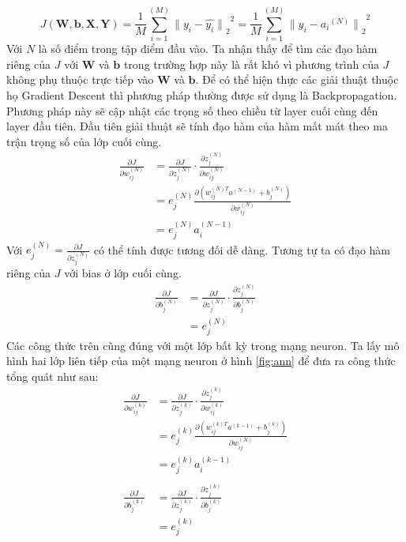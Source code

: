 \begin{equation}
	J
	\left(
		{\boldsymbol{W}},{\boldsymbol{b}},{\boldsymbol{X}},{\boldsymbol{Y}}
	\right)
	=
	{
		{\frac{1}{M}} 
		{\sum_{i=1}^{(M)}} 
		{ { {\parallel} y_i - \widehat{y_i} {\parallel} }_2 }^2
	}
	=
	{
		{\frac{1}{M}} 
		{\sum_{i=1}^{(M)}} 
		{ { {\parallel} y_i - {a_i}^{(N)} {\parallel} }_2 }^2
	}
\end{equation}
Với $N$ là số điểm trong tập điểm đầu vào. Ta nhận thấy để tìm các đạo hàm riêng của $J$ với ${\boldsymbol{W}}$ và ${\boldsymbol{b}}$ trong trường hợp này là rất khó vì phương trình của $J$ không phụ thuộc trực tiếp vào ${\boldsymbol{W}}$ và ${\boldsymbol{b}}$. Để có thể hiện thực các giải thuật thuộc họ Gradient Descent thì phương pháp thường được sử dụng là Backpropagation. Phương pháp này sẽ cập nhật các trọng số theo chiều từ layer cuối cùng đến layer đầu tiên. Đầu tiên giải thuật sẽ tính đạo hàm của hàm mất mát theo ma trận trọng số của lớp cuối cùng.
\begin{align*}
	\frac
		{ {\partial} J }
		{ {\partial} {w_{ij}^{(N)}} }
	&=
	\frac
		{ {\partial} J }
		{ {\partial} {z_{j}^{(N)}} }
	{\cdot}
	\frac
		{ {\partial} {z_{j}^{(N)}} }
		{ {\partial} {w_{ij}^{(N)}} } \\
	&=
	{e_{j}^{(N)}}
	{
		\frac
			{ {\partial} \left(
							{w_{ij}^{(N)T}}
							a^{(N-1)}
							+
							{b_{j}^{(N)}}
						 \right)
			}
			{ {\partial} {w_{ij}^{(N)}} }
	}\\
	&={e_{j}^{(N)}}{a_{i}^{(N-1)}}
\end{align*}
Với ${e_{j}^{(N)}}=\frac{{\partial}J}{{\partial}{z_{j}^{(N)}}}$ có thể tính được tương đối dễ dàng. Tương tự ta có đạo hàm riêng của $J$ với bias ở lớp cuối cùng.
\begin{align*}
	\frac
		{ {\partial} J }
		{ {\partial} {b_{j}^{(N)}} }
	&=
	\frac
		{ {\partial} J }
		{ {\partial} {z_{j}^{(N)}} }
	{\cdot}
	\frac
		{ {\partial} {z_{j}^{(N)}} }
		{ {\partial} {b_{j}^{(N)}} } \\
	&={e_{j}^{(N)}}
\end{align*}
Các công thức trên cũng đúng với một lớp bất kỳ trong mạng neuron. Ta lấy mô hình hai lớp liên tiếp của một mạng neuron ở hình \ref{fig:ann} để đưa ra công thức tổng quát như sau:
\begin{align*}
	\frac
		{ {\partial} J }
		{ {\partial} {w_{ij}^{(k)}} }
	&=
	\frac
		{ {\partial} J }
		{ {\partial} {z_{j}^{(k)}} }
	{\cdot}
	\frac
		{ {\partial} {z_{j}^{(k)}} }
		{ {\partial} {w_{ij}^{(k)}} } \\
	&=
	{e_{j}^{(k)}}
	\frac
		{ {\partial} \left(
						{w_{ij}^{(k)T}}
						a^{(k-1)}
						+
						{b_{j}^{(k)}}
					 \right)
		}
		{ {\partial} {w_{ij}^{(N)}} } \\
	&={e_{j}^{(k)}}{a_{i}^{(k-1)}} \\ \\
	\frac
		{ {\partial} J }
		{ {\partial} {b_{j}^{(k)}} }
	&=
	\frac
		{ {\partial} J }
		{ {\partial} {z_{j}^{(k)}} }
	{\cdot}
	\frac
		{ {\partial} {z_{j}^{(k)}} }
		{ {\partial} {b_{j}^{(k)}} } \\
	&={e_{j}^{(k)}}
\end{align*}
